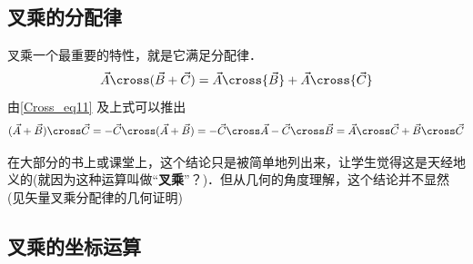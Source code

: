 \subsection{叉乘的分配律}

叉乘一个最重要的特性，就是它满足分配律．
\begin{equation}\label{Cross_eq6}
{\vec A} \cross (\vec B +\vec C) = {\vec A} \cross {\vec B} + {\vec A} \cross {\vec C}
\end{equation}
由\autoref{Cross_eq11} 及上式可以推出
\begin{equation}\label{Cross_eq7}
(\vec A + \vec B) \cross \vec C =  - \vec C \cross (\vec A + \vec B) =  - \vec C \cross \vec A - \vec C \cross \vec B = \vec A \cross \vec C + \vec B \cross \vec C
\end{equation}

在大部分的书上或课堂上，这个结论只是被简单地列出来，让学生觉得这是天经地义的(就因为这种运算叫做“\textbf{叉乘}”？)．但从几何的角度理解，这个结论并不显然(见矢量叉乘分配律的几何证明)

\subsection{叉乘的坐标运算}

